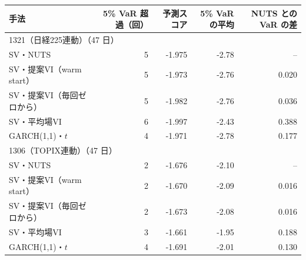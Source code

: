\begin{tabular}{lrrrr}
\toprule
手法 & 5\% VaR 超過（回） & 予測スコア & 5\% VaR の平均 & NUTS との VaR の差 \\
\midrule
\multicolumn{5}{l}{1321（日経225連動）（47 日）} \\
SV・NUTS & 5 & -1.975 & -2.78 & -- \\
SV・提案VI（warm start） & 5 & -1.973 & -2.76 & 0.020 \\
SV・提案VI（毎回ゼロから） & 5 & -1.982 & -2.76 & 0.036 \\
SV・平均場VI & 6 & -1.997 & -2.43 & 0.388 \\
GARCH(1,1)・$t$ & 4 & -1.971 & -2.78 & 0.177 \\
\midrule
\multicolumn{5}{l}{1306（TOPIX連動）（47 日）} \\
SV・NUTS & 2 & -1.676 & -2.10 & -- \\
SV・提案VI（warm start） & 2 & -1.670 & -2.09 & 0.016 \\
SV・提案VI（毎回ゼロから） & 2 & -1.673 & -2.08 & 0.016 \\
SV・平均場VI & 3 & -1.661 & -1.95 & 0.188 \\
GARCH(1,1)・$t$ & 4 & -1.691 & -2.01 & 0.130 \\
\bottomrule
\end{tabular}
